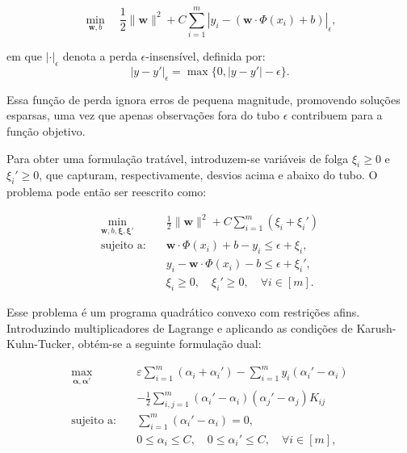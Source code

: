 \begin{equation}
\min_{\mathbf{w}, b} \quad \frac{1}{2} \|\mathbf{w}\|^2 + C \sum_{i=1}^{\mathit{m}} |\mathit{y}_i - (\mathbf{w} \cdot \Phi(x_i) + b)|_\epsilon,
\end{equation}

em que $|\cdot|_{\epsilon}$ denota a perda $\epsilon$-insensível, definida por:
\begin{equation}
|\mathit{y} - \mathit{y}'|_\epsilon = \max\{0, |\mathit{y} - \mathit{y}'| - \epsilon\}.
\end{equation}

Essa função de perda ignora erros de pequena magnitude, promovendo soluções esparsas,
uma vez que apenas observações fora do tubo $\epsilon$ contribuem para a função objetivo.

Para obter uma formulação tratável, introduzem-se variáveis de folga
$\xi_i \geq 0$ e $\xi_i' \geq 0$, que capturam, respectivamente, desvios acima e abaixo
do tubo. O problema pode então ser reescrito como:

\begin{equation}
\begin{aligned}
\min_{\mathbf{w}, b, \bm{\xi}, \bm{\xi}'} \quad
& \frac{1}{2} \|\mathbf{w}\|^2 + C \sum_{i=1}^{\mathit{m}} (\xi_i + \xi_i') \\
\text{sujeito a:} \quad
& \mathbf{w} \cdot \Phi(x_i) + b - \mathit{y}_i \leq \epsilon + \xi_i, \\
& \mathit{y}_i - \mathbf{w} \cdot \Phi(x_i) - b \leq \epsilon + \xi_i', \\
& \xi_i \geq 0, \quad \xi_i' \geq 0, \quad \forall i \in \left[\mathit{m}\right].
\end{aligned}
\end{equation}

Esse problema é um programa quadrático convexo com restrições afins. Introduzindo
multiplicadores de Lagrange e aplicando as condições de Karush-Kuhn-Tucker, obtém-se
a seguinte formulação dual:

\begin{equation}
\begin{aligned}
\max_{\bm{\alpha}, \bm{\alpha}'} \quad
& \varepsilon \sum_{i=1}^{m} (\alpha_i + \alpha_i')
- \sum_{i=1}^{m} y_i (\alpha_i' - \alpha_i) \\
& - \frac{1}{2} \sum_{i,j=1}^{m} (\alpha_i' - \alpha_i)(\alpha_j' - \alpha_j) K_{ij} \\
\text{sujeito a:} \quad
& \sum_{i=1}^{m} (\alpha_i' - \alpha_i) = 0, \\
& 0 \leq \alpha_i \leq C, \quad 0 \leq \alpha_i' \leq C, \quad \forall i \in \left[\mathit{m}\right],
\end{aligned}
\end{equation}

